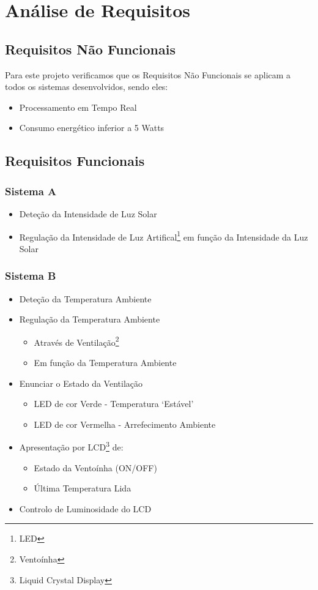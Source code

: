 \chapter{Análise de Requisitos}

\section{Requisitos Não Funcionais}
Para este projeto verificamos que os Requisitos Não Funcionais se aplicam a todos os sistemas desenvolvidos, sendo eles:
\begin{itemize}
    \item Processamento em Tempo Real
    \item Consumo energético inferior a 5 Watts
\end{itemize}

\section{Requisitos Funcionais}
\subsection{Sistema A}
\begin{itemize}
    \item Deteção da Intensidade de Luz Solar
    \item Regulação da Intensidade de Luz Artifical\footnote{LED} em função da Intensidade da Luz Solar
\end{itemize}

\subsection{Sistema B}
\begin{itemize}
    \item Deteção da Temperatura Ambiente
    \item Regulação da Temperatura Ambiente
    \begin{itemize}
        \item Através de Ventilação\footnote{Ventoínha}
        \item Em função da Temperatura Ambiente
    \end{itemize}
    \item Enunciar o Estado da Ventilação
    \begin{itemize}
        \item LED de cor Verde - Temperatura `Estável'
        \item LED de cor Vermelha - Arrefecimento Ambiente
    \end{itemize}\newpage
    \item Apresentação por LCD\footnote{Liquid Crystal Display} de:
    \begin{itemize}
        \item Estado da Ventoínha (ON/OFF)
        \item Última Temperatura Lida
    \end{itemize}
    \item Controlo de Luminosidade do LCD
\end{itemize}


